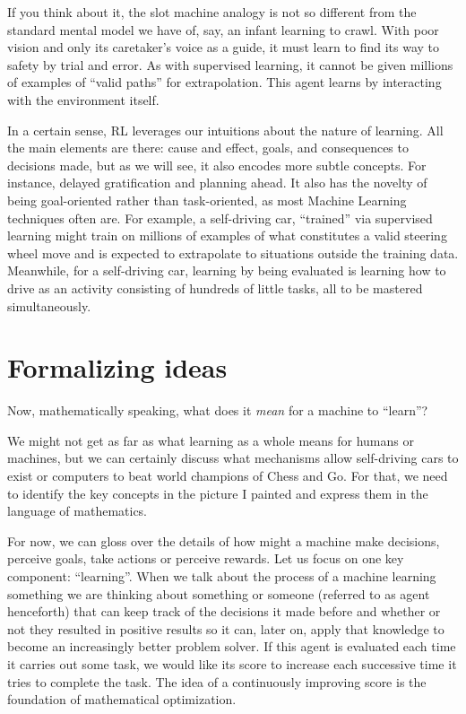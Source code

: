 If you think about it, the slot machine analogy is not so different from the
standard mental model we have of, say, an infant learning to crawl. With poor
vision and only its caretaker's voice as a guide, it must learn to find its way
to safety by trial and error. As with supervised learning, it cannot be given
millions of examples of ``valid paths'' for extrapolation. This agent learns by
interacting with the environment itself.

In a certain sense, RL leverages our intuitions about the nature of learning.
All the main elements are there: cause and effect, goals, and consequences to
decisions made, but as we will see, it also encodes more subtle concepts. For
instance, delayed gratification and planning ahead. It also has the novelty of 
being goal-oriented rather than task-oriented, as most Machine Learning
techniques often are. For example, a self-driving car, ``trained'' via
supervised learning might train on millions of examples of what constitutes a
valid steering wheel move and is expected to extrapolate to situations outside
the training data. Meanwhile, for a self-driving car, learning by being
evaluated is learning how to drive as an activity consisting of hundreds of
little tasks, all to be mastered simultaneously.

\section{Formalizing ideas}
Now, mathematically speaking, what does it \textit{mean} for a 
machine to ``learn''?

We might not get as far as what learning as a whole means for humans or
machines, but we can certainly discuss what mechanisms allow self-driving cars
to exist or computers to beat world champions of Chess and Go. For that, we need
to identify the key concepts in the picture I painted and express them in the
language of mathematics.

For now, we can gloss over the details of how might a machine make decisions,
perceive goals, take actions or perceive rewards. Let us focus on one key
component: ``learning''.  When we talk about the process of a machine learning
something we are thinking about something or someone (referred to as agent
henceforth) that can keep track of the decisions it made before and whether or
not they resulted in positive results so it can, later on, apply that knowledge
to become an increasingly better problem solver. If this agent is evaluated each
time it carries out some task, we would like its score to increase each
successive time it tries to complete the task.  The idea of a continuously
improving score is the foundation of mathematical optimization.

